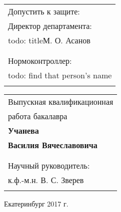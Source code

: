 \documentclass[12pt]{report}
\begin{document}
\begin{tabular}[t]{@{}l}
  Допустить к защите:\\
  Директор департамента:\\ {todo: title}М. О. Асанов\\
  \underline{\hspace{5cm}}\\
  \vspace{1em}\\
  Нормоконтроллер:\\ {todo: find that person's name}\\
  \underline{\hspace{5cm}}
\end{tabular}
\hfill%
\begin{tabular}[t]{l@{}}
    Выпускная квалификационная\\работа бакалавра\\
    \textbf{Учанева}\\
    \textbf{Василия Вячеславовича}\\
    \underline{\hspace{5cm}}\\
    \vspace{1em}\\
    Научный руководитель:\\ к.ф.-м.н. В. С. Зверев\\
    \underline{\hspace{5cm}}\\
\end{tabular}
%
%


%
%
%
%
%

\vspace*{\fill}
\begin{center}
Екатеринбург 2017 г.
\end{center}
\end{document}
